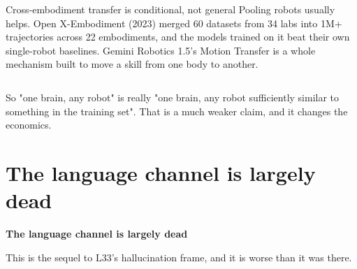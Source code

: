 \documentclass[aspectratio=169]{beamer}
\begin{document}
\begin{frame}{Cross-embodiment transfer is conditional, not general}
  \small
  Pooling robots usually helps. Open X-Embodiment (2023) merged 60 datasets from 34 labs
  into 1M+ trajectories across 22 embodiments, and the models trained on it beat their own
  single-robot baselines. Gemini Robotics 1.5's Motion Transfer is a whole mechanism built
  to move a skill from one body to another.
  \vskip 8pt
  \begin{columns}[T]
  \end{columns}
  \vskip 8pt
  \footnotesize
  \centering
  So "one brain, any robot" is really "one brain, any robot sufficiently similar to
  something in the training set". That is a much weaker claim, and it changes the economics.
\end{frame}

\section{The language channel is largely dead}

\begin{frame}[plain]
  \vfill
  \begin{center}
    {\Large\color{popblue}\textbf{The language channel is largely dead}}\\[0.9em]
    \begin{minipage}{0.82\textwidth}\centering\small
      This is the sequel to L33's hallucination frame, and it is worse than it was there.
    \end{minipage}
  \end{center}
  \vfill
\end{frame}
\end{document}
